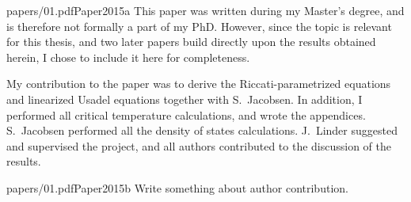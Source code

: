 \begin{paper}{papers/01.pdf}{Paper2015a}%
  This paper was written during my Master's degree, and is therefore not formally a part of my PhD.
  However, since the topic is relevant for this thesis, and two later papers build directly upon the results obtained herein, I chose to include it here for completeness.

  My contribution to the paper was to derive the Riccati-parametrized equations and linearized Usadel equations together with S.~Jacobsen.
  In addition, I performed all critical temperature calculations, and wrote the appendices.
  S.~Jacobsen performed all the density of states calculations.
  J.~Linder suggested and supervised the project, and all authors contributed to the discussion of the results.
\end{paper}

\begin{paper}{papers/01.pdf}{Paper2015b}
  Write something about author contribution.
\end{paper}

